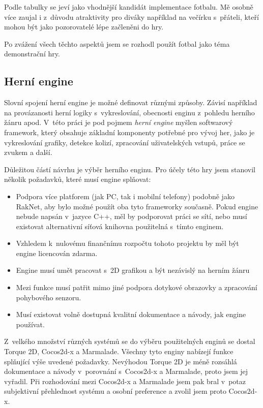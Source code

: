 \documentclass[thesis=B,czech,hidelinks]{FITthesis}[2012/06/26] %
\begin{document}
Podle tabulky se jeví jako vhodnější kandidát implementace fotbalu. Mě osobně více zaujal i z~důvodu atraktivity pro diváky například na večírku s~přáteli, kteří mohou být jako pozorovatelé lépe začleněni do hry. 

Po zvážení všech těchto aspektů jsem se rozhodl použít fotbal jako téma demonstrační hry.

\subsection{Herní engine}

Slovní spojení herní engine je možné definovat různými způsoby. Závisí například na provázanosti herní logiky s~vykreslování, obecnosti enginu z~pohledu herního žánru apod. V~této práci je pod pojmem \textit{herní engine} myšlen softwarový framework, který obsahuje základní komponenty potřebné pro vývoj her, jako je vykreslování grafiky, detekce kolizí, zpracování uživatelských vstupů, práce se zvukem a další. \cite{gameengine}

Důležitou částí návrhu je výběr herního enginu. Pro účely této hry jsem stanovil několik požadavků, které musí engine splňovat:

\begin{itemize}
	\item Podpora více platforem (jak PC, tak i mobilní telefony) podobně jako RakNet, aby bylo možné použít oba tyto frameworky současně. Pokud engine nebude napsán v~jazyce C++, měl by podporovat práci se sítí, nebo musí existovat alternativní síťová knihovna použitelná s~tímto enginem.
	\item Vzhledem k~nulovému finančnímu rozpočtu tohoto projektu by měl být engine licencován zdarma.
	\item Engine musí umět pracovat s~2D grafikou a být nezávislý na herním žánru
	\item Mezi funkce musí patřit mimo jiné podpora dotykové obrazovky a zpracování pohybového senzoru.
	\item Musí existovat volně dostupná kvalitní dokumentace a návody, jak engine používat.
\end{itemize}

Z~velkého množství různých systémů se do výběru použitelných enginů se dostal Torque 2D, Cocos2d-x a Marmalade. Všechny tyto enginy nabízejí funkce splňující výše uvedené požadavky. Nevýhodou Torque 2D je méně rozsáhlá dokumentace a návody v~porovnání s~Cocos2d-x a Marmalade, proto jsem jej vyřadil. Při rozhodování mezi Cocos2d-x a Marmalade jsem pak bral v~potaz subjektivní přehlednost systému a osobní preference a zvolil jsem proto Cocos2d-x.
\end{document}
